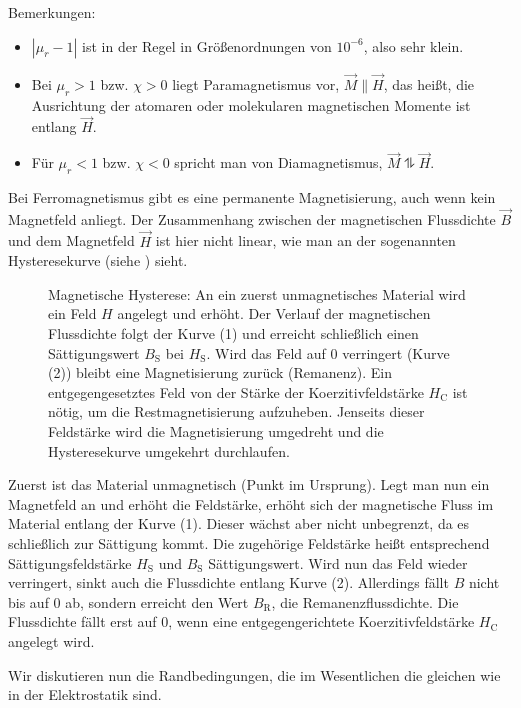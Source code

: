 Bemerkungen:
\begin{itemize}
	\item $\left| \mu _{r}-1\right| $ ist in der Regel in Größenordnungen von $10^{-6}$, also sehr klein.

	\item Bei $\mu _{r}>1$ bzw. $\chi >0$ liegt Paramagnetismus vor, $\vec {M}\parallel \vec {H}$, das heißt, die Ausrichtung der atomaren oder molekularen magnetischen Momente ist entlang $\vec {H}$.

	\item Für $\mu _{r}<1$ bzw. $\chi <0$ spricht man von Diamagnetismus, $\vec {M}\updownharpoons \vec {H}$.
\end{itemize}


Bei Ferromagnetismus gibt es eine permanente Magnetisierung, auch wenn kein Magnetfeld anliegt. Der Zusammenhang zwischen der magnetischen Flussdichte $\vec {B}$ und dem Magnetfeld $\vec {H}$ ist hier nicht linear, wie man an der sogenannten Hysteresekurve (siehe ) sieht.

\begin{figure}[ht]
	\centering
	\tfigHysteresis
	\caption{Magnetische Hysterese: An ein zuerst unmagnetisches Material wird ein Feld $H$ angelegt und erhöht. Der Verlauf der magnetischen Flussdichte folgt der Kurve (1) und erreicht schließlich einen Sättigungswert $B_\mathrm{S}$ bei $H_\mathrm{S}$. Wird das Feld auf 0 verringert (Kurve (2)) bleibt eine Magnetisierung zurück (Remanenz). Ein entgegengesetztes Feld von der Stärke der Koerzitivfeldstärke $H_\mathrm{C}$ ist nötig, um die Restmagnetisierung aufzuheben. Jenseits dieser Feldstärke wird die Magnetisierung umgedreht und die Hysteresekurve umgekehrt durchlaufen. }
	\label{fig:hysterese}
\end{figure}
Zuerst ist das Material unmagnetisch (Punkt im Ursprung). Legt man nun ein Magnetfeld an und erhöht die Feldstärke, erhöht sich der magnetische Fluss im Material entlang der Kurve (1). Dieser wächst aber nicht unbegrenzt, da es schließlich zur Sättigung kommt. Die zugehörige Feldstärke heißt entsprechend Sättigungsfeldstärke $H_{\mathrm{S}}$ und $B_{\mathrm{S}}$ Sättigungswert. Wird nun das Feld wieder verringert, sinkt auch die Flussdichte entlang Kurve (2). Allerdings fällt $B$ nicht bis auf $0$ ab, sondern erreicht den Wert $B_{\mathrm{R}}$, die Remanenzflussdichte. Die Flussdichte fällt erst auf $0$, wenn eine entgegengerichtete Koerzitivfeldstärke $H_{\mathrm{C}}$ angelegt wird.

Wir diskutieren nun die Randbedingungen, die im Wesentlichen die gleichen wie in der Elektrostatik sind.

